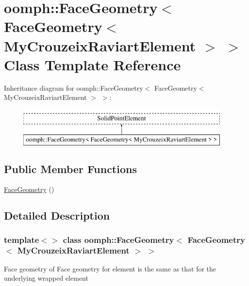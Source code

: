 \hypertarget{classoomph_1_1FaceGeometry_3_01FaceGeometry_3_01MyCrouzeixRaviartElement_01_4_01_4}{}\section{oomph\+:\+:Face\+Geometry$<$ Face\+Geometry$<$ My\+Crouzeix\+Raviart\+Element $>$ $>$ Class Template Reference}
\label{classoomph_1_1FaceGeometry_3_01FaceGeometry_3_01MyCrouzeixRaviartElement_01_4_01_4}
Inheritance diagram for oomph\+:\+:Face\+Geometry$<$ Face\+Geometry$<$ My\+Crouzeix\+Raviart\+Element $>$ $>$\+:\begin{figure}[H]
\begin{center}
\leavevmode
\includegraphics[height=2.000000cm]{classoomph_1_1FaceGeometry_3_01FaceGeometry_3_01MyCrouzeixRaviartElement_01_4_01_4}
\end{center}
\end{figure}
\subsection*{Public Member Functions}
\begin{DoxyCompactItemize}
\item 
\hyperlink{classoomph_1_1FaceGeometry_3_01FaceGeometry_3_01MyCrouzeixRaviartElement_01_4_01_4_ace1479da1535c271d7dc671dacbbdcca}{Face\+Geometry} ()
\end{DoxyCompactItemize}


\subsection{Detailed Description}
\subsubsection*{template$<$$>$\newline
class oomph\+::\+Face\+Geometry$<$ Face\+Geometry$<$ My\+Crouzeix\+Raviart\+Element $>$ $>$}

Face geometry of Face geometry for element is the same as that for the underlying wrapped element 


